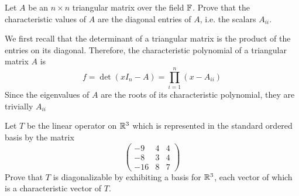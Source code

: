 \documentclass[a4paper, 10pt]{article}
\begin{document}
\begin{problem} 
Let \(A\) be an \(n \times n\) triangular matrix over the field \(\mathbb{F}\). Prove that the characteristic values of \(A\) are the diagonal entries of \(A\), i.e. the scalars \(A_{ii}\).
\end{problem}
\begin{solution}
    We first recall that the determinant of a triangular matrix is the product of the entries on its diagonal. Therefore, the characteristic polynomial of a triangular matrix \(A\) is \[
        f = \det (x I_n - A) = \prod_{i=1}^n(x-A_{ii})
    \]
    Since the eigenvalues of \(A\) are the roots of its characteristic polynomial, they are trivially \(A_{ii}\)
\end{solution}

\begin{problem} 
Let \(T\) be the linear operator on \(\mathbb{R}^3\) which is represented in the standard ordered basis by the matrix \[
    \begin{pmatrix}
        -9  & 4 & 4 \\
        -8  & 3 & 4 \\
        -16 & 8 & 7
    \end{pmatrix}
\]
Prove that \(T\) is diagonalizable by exhibiting a basis for \(\mathbb{R}^3\), each vector of which is a characteristic vector of \(T\).
\end{problem}
\end{document}
